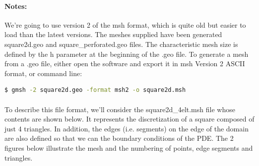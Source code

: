 \documentclass[english,10pt,a4paper]{article}
\begin{document}
\paragraph{Notes:} We're going to use version 2 of the msh format, which is quite old but easier to load than the latest versions. The meshes supplied have been generated
square2d.geo and square\_perforated.geo files. The characteristic mesh size is defined by the h parameter at the beginning of the .geo file.
To generate a mesh from a .geo file, either open the software and export it in msh Version 2 ASCII format, or
command line: 
\begin{lstlisting}[language=bash]
$ gmsh -2 square2d.geo -format msh2 -o square2d.msh
\end{lstlisting}

\paragraph{}
To describe this file format, we'll consider the square2d\_4elt.msh file whose contents are shown below.
It represents the discretization of a square composed of just 4 triangles. In addition, the edges (i.e. segments) on the edge of the domain are also defined so that we can
the boundary conditions of the PDE. The 2 figures below illustrate the mesh and the numbering of points, edge segments and triangles.
\end{document}

